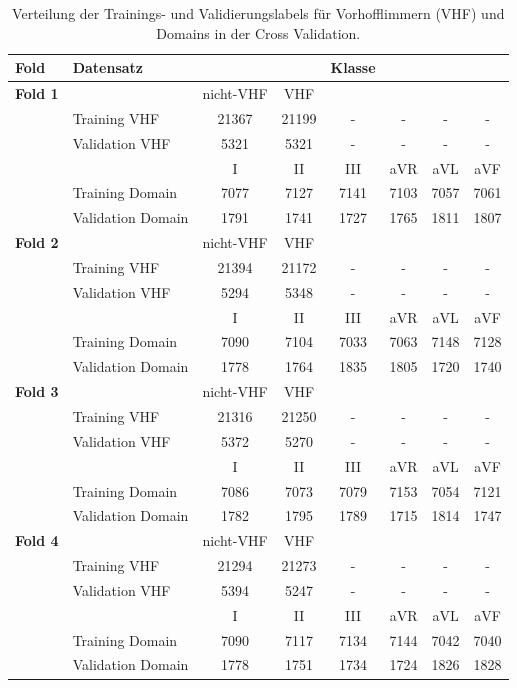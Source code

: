 \begin{table}[h!]
\centering
\caption[Klassenverteilung Cross Validation]{Verteilung der Trainings- und Validierungslabels für Vorhofflimmern (VHF) und Domains in der Cross Validation.}
\label{tab:folds}
\begin{tabular}{llcccccc}
\toprule
\textbf{Fold} & \textbf{Datensatz} &  &  & \textbf{Klasse} &  &  &  \\
\midrule
\textbf{Fold 1} & & nicht-VHF & VHF & & & &\\
\cmidrule{2-8}
	   & Training VHF       & 21367 & 21199 & - & - & - & - \\
       & Validation VHF     & 5321 & 5321 & - & - & - & - \\
\cmidrule{3-8}
       & & I & II & III & aVR & aVL & aVF \\
\cmidrule{3-8}
       & Training Domain    & 7077 & 7127 & 7141 & 7103 & 7057 & 7061 \\
       & Validation Domain  & 1791 & 1741 & 1727 & 1765 & 1811 & 1807 \\
\midrule

\textbf{Fold 2} & & nicht-VHF & VHF & & & &\\
\cmidrule{2-8}
	   & Training VHF       & 21394 & 21172 & - & - & - & - \\
       & Validation VHF     & 5294 & 5348 & - & - & - & - \\
\cmidrule{3-8}
       & & I & II & III & aVR & aVL & aVF \\
\cmidrule{3-8}
       & Training Domain    & 7090 & 7104 & 7033 & 7063 & 7148 & 7128 \\
       & Validation Domain  & 1778 & 1764 & 1835 & 1805 & 1720 & 1740 \\
\midrule


\textbf{Fold 3} & & nicht-VHF & VHF & & & &\\
\cmidrule{2-8}
	   & Training VHF       & 21316 & 21250 & - & - & - & - \\
       & Validation VHF     & 5372 & 5270 & - & - & - & - \\
\cmidrule{3-8}
       & & I & II & III & aVR & aVL & aVF \\
\cmidrule{3-8}
       & Training Domain    & 7086 & 7073 & 7079 & 7153 & 7054 & 7121 \\
       & Validation Domain  & 1782 & 1795 & 1789 & 1715 & 1814 & 1747 \\
\midrule


\textbf{Fold 4} & & nicht-VHF & VHF & & & &\\
\cmidrule{2-8}
	   & Training VHF       & 21294 & 21273 & - & - & - & - \\
       & Validation VHF     & 5394 & 5247 & - & - & - & - \\
\cmidrule{3-8}
       & & I & II & III & aVR & aVL & aVF \\
\cmidrule{3-8}
       & Training Domain    & 7090 & 7117 & 7134 & 7144 & 7042 & 7040 \\
       & Validation Domain  & 1778 & 1751 & 1734 & 1724 & 1826 & 1828 \\
\midrule


\end{tabular}
\end{table}
